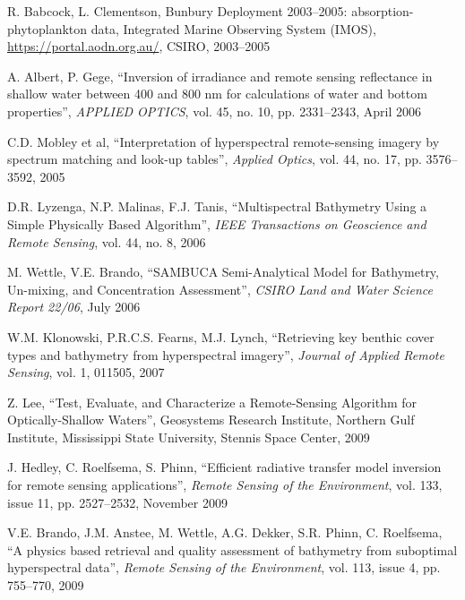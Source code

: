 \begin{thebibliography}{99}
 R. Babcock, L. Clementson, Bunbury Deployment 2003--2005: absorption-phytoplankton data, Integrated Marine Observing System (IMOS), \url{https://portal.aodn.org.au/}, CSIRO, 2003--2005

 A. Albert, P. Gege, ``Inversion of irradiance and remote sensing reflectance in shallow water between 400 and 800 nm for calculations of water and bottom properties'', \textit{APPLIED OPTICS}, vol. 45, no. 10, pp. 2331--2343, April 2006

 C.D. Mobley et al, ``Interpretation of hyperspectral remote-sensing imagery by spectrum matching and look-up tables'', \textit{Applied Optics}, vol. 44, no. 17, pp. 3576--3592, 2005

 D.R. Lyzenga, N.P. Malinas, F.J. Tanis, ``Multispectral Bathymetry Using a Simple Physically Based Algorithm'', \textit{IEEE Transactions on Geoscience and Remote Sensing}, vol. 44, no. 8, 2006

 M. Wettle, V.E. Brando, ``SAMBUCA Semi-Analytical Model for Bathymetry, Un-mixing, and Concentration Assessment'', \textit{CSIRO Land and Water Science Report 22/06}, July 2006



 W.M. Klonowski, P.R.C.S. Fearns, M.J. Lynch, ``Retrieving key benthic cover types and bathymetry from hyperspectral imagery'', \textit{Journal of Applied Remote Sensing}, vol. 1, 011505, 2007

 Z. Lee, ``Test, Evaluate, and Characterize a Remote-Sensing Algorithm for Optically-Shallow Waters'', Geosystems Research Institute, Northern Gulf Institute, Mississippi State University, Stennis Space Center, 2009

 J. Hedley, C. Roelfsema, S. Phinn, ``Efficient radiative transfer model inversion for remote sensing applications'', \textit{Remote Sensing of the Environment}, vol. 133, issue 11, pp. 2527--2532, November 2009

 V.E. Brando, J.M. Anstee, M. Wettle, A.G. Dekker, S.R. Phinn, C. Roelfsema, ``A physics based retrieval and quality assessment of bathymetry from suboptimal hyperspectral data'', \textit{Remote Sensing of the Environment}, vol. 113, issue 4, pp. 755--770, 2009


\end{thebibliography}
